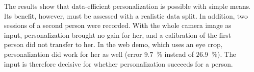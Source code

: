 The results show that data-efficient personalization is possible with simple
means. Its benefit, however, must be assessed with a realistic data split. In
addition, two sessions of a second person were recorded. With the whole camera
image as input, personalization brought no gain for her, and a calibration of
the first person did not transfer to her. In the web demo, which uses an eye
crop, personalization did work for her as well (error \SI{9.7}{\percent}
instead of \SI{26.9}{\percent}). The input is therefore decisive for whether
personalization succeeds for a person.


\ifZweiteSprache
